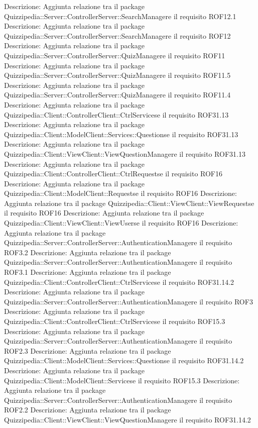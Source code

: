 Descrizione: Aggiunta relazione tra il package Quizzipedia::Server::ControllerServer::SearchManagere il requisito ROF12.1 
Descrizione: Aggiunta relazione tra il package Quizzipedia::Server::ControllerServer::SearchManagere il requisito ROF12 
Descrizione: Aggiunta relazione tra il package Quizzipedia::Server::ControllerServer::QuizManagere il requisito ROF11 
Descrizione: Aggiunta relazione tra il package Quizzipedia::Server::ControllerServer::QuizManagere il requisito ROF11.5 
Descrizione: Aggiunta relazione tra il package Quizzipedia::Server::ControllerServer::QuizManagere il requisito ROF11.4 
Descrizione: Aggiunta relazione tra il package Quizzipedia::Client::ControllerClient::CtrlServicese il requisito ROF31.13 
Descrizione: Aggiunta relazione tra il package Quizzipedia::Client::ModelClient::Services::Questionse il requisito ROF31.13 
Descrizione: Aggiunta relazione tra il package Quizzipedia::Client::ViewClient::ViewQuestionManagere il requisito ROF31.13 
Descrizione: Aggiunta relazione tra il package Quizzipedia::Client::ControllerClient::CtrlRequestse il requisito ROF16 
Descrizione: Aggiunta relazione tra il package Quizzipedia::Client::ModelClient::Requestse il requisito ROF16 
Descrizione: Aggiunta relazione tra il package Quizzipedia::Client::ViewClient::ViewRequestse il requisito ROF16 
Descrizione: Aggiunta relazione tra il package Quizzipedia::Client::ViewClient::ViewUserse il requisito ROF16 
Descrizione: Aggiunta relazione tra il package Quizzipedia::Server::ControllerServer::AuthenticationManagere il requisito ROF3.2 
Descrizione: Aggiunta relazione tra il package Quizzipedia::Server::ControllerServer::AuthenticationManagere il requisito ROF3.1 
Descrizione: Aggiunta relazione tra il package Quizzipedia::Client::ControllerClient::CtrlServicese il requisito ROF31.14.2 
Descrizione: Aggiunta relazione tra il package Quizzipedia::Server::ControllerServer::AuthenticationManagere il requisito ROF3 
Descrizione: Aggiunta relazione tra il package Quizzipedia::Client::ControllerClient::CtrlServicese il requisito ROF15.3 
Descrizione: Aggiunta relazione tra il package Quizzipedia::Server::ControllerServer::AuthenticationManagere il requisito ROF2.3 
Descrizione: Aggiunta relazione tra il package Quizzipedia::Client::ModelClient::Services::Questionse il requisito ROF31.14.2 
Descrizione: Aggiunta relazione tra il package Quizzipedia::Client::ModelClient::Servicese il requisito ROF15.3 
Descrizione: Aggiunta relazione tra il package Quizzipedia::Server::ControllerServer::AuthenticationManagere il requisito ROF2.2 
Descrizione: Aggiunta relazione tra il package Quizzipedia::Client::ViewClient::ViewQuestionManagere il requisito ROF31.14.2 
